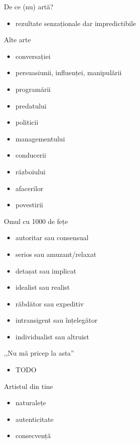 \documentclass{beamer}
\begin{document}
\begin{frame}{De ce (nu) artă?}
  \begin{itemize}
    \item rezultate senzaționale dar impredictibile
  \end{itemize}
\end{frame}

\begin{frame}{Alte arte}
  \begin{itemize}
    \pause
    \item conversației
    \item persuasiunii, influenței, manipulării
    \item programării
    \item predatului
    \item politicii
    \item managementului
    \item conducerii
    \item războiului
    \item afacerilor
    \item povestirii
  \end{itemize}
\end{frame}

\begin{frame}{Omul cu 1000 de fețe}
  \begin{itemize}
    \item autoritar sau consensual
    \item serios sau amuzant/relaxat
    \item detașat sau implicat
    \item idealist sau realist
    \item răbdător sau expeditiv
    \item intransigent sau înțelegător
    \item individualist sau altruist
  \end{itemize}
\end{frame}

\begin{frame}{,,Nu mă pricep la asta''}
  \begin{itemize}
    \item TODO
  \end{itemize}
\end{frame}

\begin{frame}{Artistul din tine}
  \begin{itemize}
    \item naturalețe
    \item autenticitate
    \item consecvență
  \end{itemize}
\end{frame}
\end{document}
